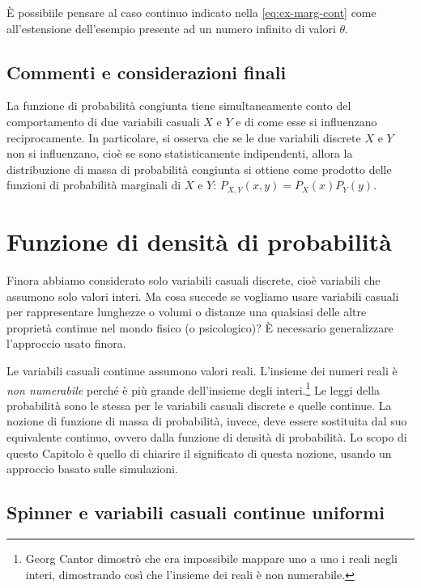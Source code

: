 \documentclass[
  11pt,
]{krantz}
\theoremstyle{definition}
\theoremstyle{definition}
\theoremstyle{definition}
\theoremstyle{definition}
\theoremstyle{remark}
\begin{document}
È possibiile pensare al caso continuo indicato nella \eqref{eq:ex-marg-cont} come all'estensione dell'esempio presente ad un numero infinito di valori \(\theta\).

\hypertarget{commenti-e-considerazioni-finali-3}{%
\section*{Commenti e considerazioni finali}\label{commenti-e-considerazioni-finali-3}}


La funzione di probabilità congiunta tiene simultaneamente conto del comportamento di due variabili casuali \(X\) e \(Y\) e di come esse si influenzano reciprocamente. In particolare, si osserva che se le due variabili discrete \(X\) e \(Y\) non si influenzano, cioè se sono statisticamente indipendenti, allora la distribuzione di massa di probabilità congiunta si ottiene come prodotto delle funzioni di probabilità marginali di \(X\) e \(Y\): \(P_{X, Y}(x, y) = P_X(x) P_Y(y)\).

\hypertarget{chapter-intro-density-function}{%
\chapter{Funzione di densità di probabilità}\label{chapter-intro-density-function}}

Finora abbiamo considerato solo variabili casuali discrete, cioè variabili che assumono solo valori interi. Ma cosa succede se vogliamo usare variabili casuali per rappresentare lunghezze o volumi o distanze una qualsiasi delle altre proprietà continue nel mondo fisico (o psicologico)? È necessario generalizzare l'approccio usato finora.

Le variabili casuali continue assumono valori reali. L'insieme dei numeri reali è \emph{non numerabile} perché è più grande dell'insieme degli interi.\footnote{Georg Cantor dimostrò che era impossibile mappare uno a uno i reali negli interi, dimostrando così che l'insieme dei reali è non numerabile.} Le leggi della probabilità sono le stessa per le variabili casuali discrete e quelle continue. La nozione di funzione di massa di probabilità, invece, deve essere sostituita dal suo equivalente continuo, ovvero dalla funzione di densità di probabilità. Lo scopo di questo Capitolo è quello di chiarire il significato di questa nozione, usando un approccio basato sulle simulazioni.

\hypertarget{spinner-e-variabili-casuali-continue-uniformi}{%
\section{Spinner e variabili casuali continue uniformi}\label{spinner-e-variabili-casuali-continue-uniformi}}
\end{document}
